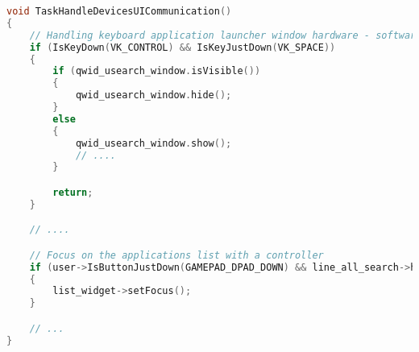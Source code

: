 \begin{lstlisting}[language=C++, style=cppstyle]
void TaskHandleDevicesUICommunication()
{
    // Handling keyboard application launcher window hardware - software communication
    if (IsKeyDown(VK_CONTROL) && IsKeyJustDown(VK_SPACE))
    {
        if (qwid_usearch_window.isVisible())
        {
            qwid_usearch_window.hide();
        }
        else
        {
            qwid_usearch_window.show();
            // ....
        }

        return;
    }

    // ....

    // Focus on the applications list with a controller
    if (user->IsButtonJustDown(GAMEPAD_DPAD_DOWN) && line_all_search->hasFocus())
    {
        list_widget->setFocus();
    }

    // ...
}
\end{lstlisting}





\begin{lstlisting}[language=C++, style=cppstyle]

\end{lstlisting}